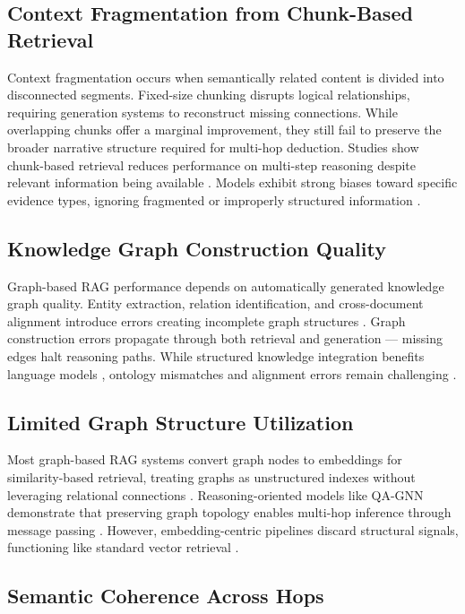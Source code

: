 \documentclass[runningheads]{llncs}
\begin{document}
\subsection{Context Fragmentation from Chunk-Based Retrieval}

Context fragmentation occurs when semantically related content is divided into disconnected segments. Fixed-size chunking disrupts logical relationships, requiring generation systems to reconstruct missing connections. While overlapping chunks offer a marginal improvement, they still fail to preserve the broader narrative structure required for multi-hop deduction. Studies show chunk-based retrieval reduces performance on multi-step reasoning despite relevant information being available \cite{11}. Models exhibit strong biases toward specific evidence types, ignoring fragmented or improperly structured information \cite{12}.

\subsection{Knowledge Graph Construction Quality}

Graph-based RAG performance depends on automatically generated knowledge graph quality. Entity extraction, relation identification, and cross-document alignment introduce errors creating incomplete graph structures \cite{14,15}. Graph construction errors propagate through both retrieval and generation — missing edges halt reasoning paths. While structured knowledge integration benefits language models \cite{16}, ontology mismatches and alignment errors remain challenging \cite{17}.

\subsection{Limited Graph Structure Utilization}

Most graph-based RAG systems convert graph nodes to embeddings for similarity-based retrieval, treating graphs as unstructured indexes without leveraging relational connections \cite{18}. Reasoning-oriented models like QA-GNN demonstrate that preserving graph topology enables multi-hop inference through message passing \cite{19,20}. However, embedding-centric pipelines discard structural signals, functioning like standard vector retrieval \cite{21}.

\subsection{Semantic Coherence Across Hops}
\end{document}

